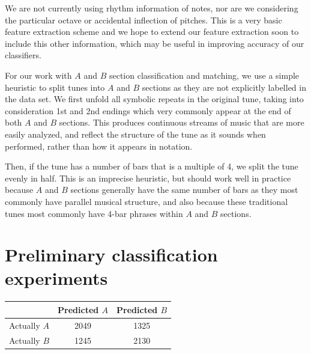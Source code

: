 \documentclass{article} %
\begin{document}
We are not currently using rhythm information of notes, nor are we considering
the particular octave or accidental inflection of pitches. This is a very basic
feature extraction scheme and we hope to extend our feature extraction soon to
include this other information, which may be useful in improving accuracy of our
classifiers.

For our work with $A$ and $B$ section classification and matching, we use a
simple heuristic to split tunes into $A$ and $B$ sections as they are not
explicitly labelled in the data set. We first unfold all symbolic repeats in the
original tune, taking into consideration 1st and 2nd endings which very commonly
appear at the end of both $A$ and $B$ sections. This produces continuous streams
of music that are more easily analyzed, and reflect the structure of the tune as
it sounds when performed, rather than how it appears in notation.

Then, if the tune has a number of bars that is a multiple of 4, we split the
tune evenly in half. This is an imprecise heuristic, but should work well in
practice because $A$ and $B$ sections generally have the same number of bars as
they most commonly have parallel musical structure, and also because these
traditional tunes most commonly have 4-bar phrases within $A$ and $B$ sections.

\section{Preliminary classification experiments}

\begin{tabular}{c|cc}
             & Predicted $A$ & Predicted $B$ \\ \hline
Actually $A$ & 2049          & 1325          \\
Actually $B$ & 1245          & 2130
\end{tabular}
\end{document}
